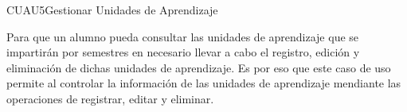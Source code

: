 \begin{UseCase}{CUAU5}{Gestionar Unidades de Aprendizaje}
	{
		Para que un alumno pueda consultar las unidades de aprendizaje que se impartirán por semestres en necesario llevar a cabo el registro, edición y eliminación de dichas unidades de aprendizaje. Es por eso que este caso de uso permite al  controlar la información de las unidades de aprendizaje mendiante las operaciones de registrar, editar y eliminar.
			
		}
		
		
		

\end{UseCase}
